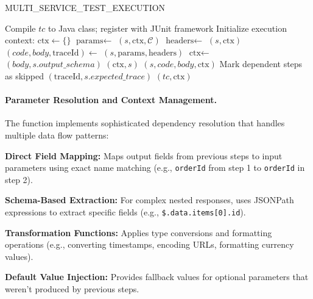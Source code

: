 \documentclass[conference]{IEEEtran}
\begin{document}
\begin{algorithm}[tb]
\caption{MULTI\_SERVICE\_TEST\_EXECUTION}\label{alg:execute}
\footnotesize
\begin{algorithmic}[1]
\Require{}
\Ensure{}
    \State Compile $tc$ to Java class; register with JUnit framework
    \State Initialize execution context: $\text{ctx} \gets \{\}$
        \State $\text{params} \gets$ $(s, \text{ctx}, \mathcal{C})$
        \State $\text{headers} \gets$ $(s, \text{ctx})$
        \State $(code, body, \text{traceId}) \gets$ $(s, \text{params}, \text{headers})$
            \State $\text{ctx} \gets$ $(body, s.output\_schema)$
            \State {}$(\text{ctx}, s)$
        \Else
            \State {}$(s, code, body, \text{ctx})$
            \State Mark dependent steps as skipped
        \EndIf
            \State {}$(\text{traceId}, s.expected\_trace)$
        \EndIf
    \EndFor
    \State {}$(tc, \text{ctx})$
\EndFor
\end{algorithmic}
\end{algorithm}

\paragraph{Parameter Resolution and Context Management.}
The  function implements sophisticated
dependency resolution that handles multiple data flow patterns:

\textbf{Direct Field Mapping:} Maps output fields from previous steps
to input parameters using exact name matching (e.g., \texttt{orderId}
from step 1 to \texttt{orderId} in step 2).

\textbf{Schema-Based Extraction:} For complex nested responses, uses
JSONPath expressions to extract specific fields (e.g.,
\texttt{\$.data.items[0].id}).

\textbf{Transformation Functions:} Applies type conversions and
formatting operations (e.g., converting timestamps, encoding URLs,
formatting currency values).

\textbf{Default Value Injection:} Provides fallback values for
optional parameters that weren't produced by previous steps.
\end{document}
